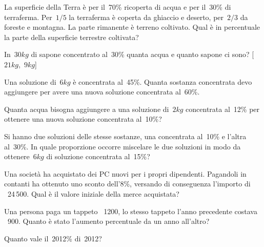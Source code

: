 \begin{multicols}{2}
\begin{esercizio}
 \label{ese:3.107}
La superficie della Terra è per il~70\% ricoperta di acqua e per il~30\% 
di terraferma.
Per~$1/5$ la terraferma è coperta da ghiaccio e deserto, per~$2/3$ da 
foreste e montagna.
La parte rimanente è terreno coltivato. Qual è in percentuale la parte 
della superficie terrestre coltivata?
\end{esercizio}

\begin{esercizio}[\Ast]
 \label{ese:3.108}
In~$30\unit{kg}$ di sapone concentrato al~30\% quanta acqua e quanto sapone 
ci sono? \hfill [$21\unit{kg}$,~$9\unit{kg}$]
\end{esercizio}

\begin{esercizio}
 \label{ese:3.109}
Una soluzione di~$6\unit{kg}$ è concentrata al~45\%. Quanta sostanza 
concentrata devo aggiungere per avere una nuova soluzione concentrata al~60\%.
\end{esercizio}

\begin{esercizio}
 \label{ese:3.110}
Quanta acqua bisogna aggiungere a una soluzione di~$2\unit{kg}$
concentrata al~12\% per ottenere una nuova soluzione concentrata al~10\%?
\end{esercizio}

\begin{esercizio}
 \label{ese:3.111}
Si hanno due soluzioni delle stesse sostanze, una concentrata al~10\% e 
l'altra al~30\%.
In quale proporzione occorre miscelare le due soluzioni in modo da 
ottenere~$6\unit{kg}$ di soluzione concentrata al~15\%?
\end{esercizio}

\begin{esercizio}
 \label{ese:3.112}
Una società ha acquistato dei PC nuovi per i propri dipendenti. 
Pagandoli in contanti ha ottenuto uno sconto dell'8\%,
versando di conseguenza l'importo di \officialeuro\ 24\,500. 
Qual è il valore iniziale della merce acquistata?
\end{esercizio}

\begin{esercizio}
 \label{ese:3.113}
Una persona paga un tappeto \officialeuro\ 1200, lo stesso tappeto 
l'anno precedente costava \officialeuro\ 900.
Quanto è stato l'aumento percentuale da un anno all'altro?
\end{esercizio}

\begin{esercizio}
 \label{ese:3.114}
Quanto vale il~2012\% di~2012?
\end{esercizio}
\end{multicols}

